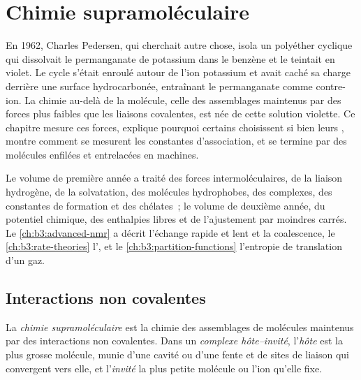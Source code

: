 \chapter{Chimie supramoléculaire}\label{ch:b3:supramolecular}

En 1962, Charles Pedersen, qui cherchait autre chose, isola un polyéther
cyclique qui dissolvait le permanganate de potassium dans le benzène et le
teintait en violet. Le cycle s'était enroulé autour de l'ion potassium et
avait caché sa charge derrière une surface hydrocarbonée, entraînant le
permanganate comme contre-ion. La chimie au-delà de la molécule, celle des
assemblages maintenus par des forces plus faibles que les liaisons
covalentes, est née de cette solution violette. Ce chapitre mesure ces
forces, explique pourquoi certains  choisissent si bien leurs ,
montre comment se mesurent les constantes d'association, et se termine par
des molécules enfilées et entrelacées en machines.

\begin{recall}
Le volume de première année a traité des forces intermoléculaires, de la
liaison hydrogène, de la solvatation, des molécules hydrophobes, des
complexes, des constantes de formation et des chélates~; le volume de
deuxième année, du potentiel chimique, des enthalpies libres et de
l'ajustement par moindres carrés. Le \cref{ch:b3:advanced-nmr} a décrit
l'échange rapide et lent et la coalescence, le \cref{ch:b3:rate-theories}
l', et le \cref{ch:b3:partition-functions} l'entropie de
translation d'un gaz.
\end{recall}

\section{Interactions non covalentes}

\begin{definition}\label{def:b3:supramolecular:supramolecular}
La \emph{chimie supramoléculaire} est la chimie
des assemblages de molécules maintenus par des interactions non covalentes.
Dans un \emph{complexe hôte--invité}, l'\emph{hôte}
est la plus grosse molécule, munie d'une cavité ou d'une fente et de sites
de liaison qui convergent vers elle, et l'\emph{invité} la plus petite
molécule ou l'ion qu'elle fixe.
\end{definition}


